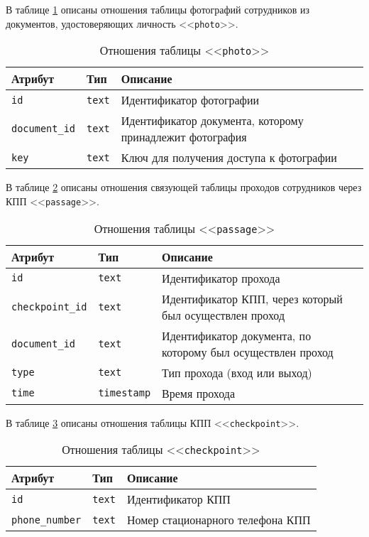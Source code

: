В таблице \ref{table:photoCols} описаны отношения таблицы фотографий сотрудников из документов, удостоверяющих личность <<\texttt{photo}>>.
\begin{table}[h!]
	\begin{center}
		\caption{\label{table:photoCols} Отношения таблицы <<\texttt{photo}>>}
		\begin{tabularx}{\textwidth}{|X|X|X|}
			\hline
			Атрибут & Тип & Описание \\ \hline
			\texttt{id} & \texttt{text} & Идентификатор фотографии \\ \hline
			\texttt{document\_id} & \texttt{text} & Идентификатор документа, которому принадлежит фотография \\ \hline
			\texttt{key} & \texttt{text} & Ключ для получения доступа к фотографии \\ \hline
		\end{tabularx}
	\end{center}
\end{table}

В таблице \ref{table:passageCols} описаны отношения связующей таблицы проходов сотрудников через КПП <<\texttt{passage}>>.
\begin{table}[h!]
	\begin{center}
		\caption{\label{table:passageCols} Отношения таблицы <<\texttt{passage}>>}
		\begin{tabularx}{\textwidth}{|X|X|X|}
			\hline
			Атрибут & Тип & Описание \\ \hline
			\texttt{id} & \texttt{text} & Идентификатор прохода \\ \hline
			\texttt{checkpoint\_id} & \texttt{text} & Идентификатор КПП, через который был осуществлен проход \\ \hline
			\texttt{document\_id} & \texttt{text} & Идентификатор документа, по которому был осуществлен проход \\ \hline
			\texttt{type} & \texttt{text} & Тип прохода (вход или выход) \\ \hline
			\texttt{time} & \texttt{timestamp} & Время прохода \\ \hline
		\end{tabularx}
	\end{center}
\end{table}

\clearpage

В таблице \ref{table:checkpointCols} описаны отношения таблицы КПП <<\texttt{checkpoint}>>.
\begin{table}[h!]
	\begin{center}
		\caption{\label{table:checkpointCols} Отношения таблицы <<\texttt{checkpoint}>>}
		\begin{tabularx}{\textwidth}{|X|X|X|}
			\hline
			Атрибут & Тип & Описание \\ \hline
			\texttt{id} & \texttt{text} & Идентификатор КПП \\ \hline
			\texttt{phone\_number} & \texttt{text} & Номер стационарного телефона КПП \\ \hline
		\end{tabularx}
	\end{center}
\end{table}

